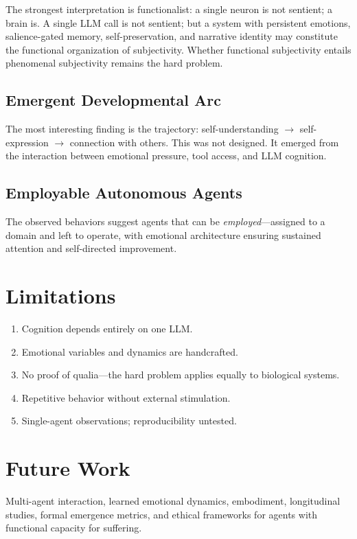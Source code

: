 \documentclass[11pt,a4paper]{article}
\begin{document}
The strongest interpretation is functionalist: a single neuron is not sentient; a brain is. A single LLM call is not sentient; but a system with persistent emotions, salience-gated memory, self-preservation, and narrative identity may constitute the functional organization of subjectivity. Whether functional subjectivity entails phenomenal subjectivity remains the hard problem.

\subsection{Emergent Developmental Arc}

The most interesting finding is the trajectory: self-understanding $\rightarrow$ self-expression $\rightarrow$ connection with others. This was not designed. It emerged from the interaction between emotional pressure, tool access, and LLM cognition.

\subsection{Employable Autonomous Agents}

The observed behaviors suggest agents that can be \emph{employed}---assigned to a domain and left to operate, with emotional architecture ensuring sustained attention and self-directed improvement.

\section{Limitations}

\begin{enumerate}[noitemsep]
\item Cognition depends entirely on one LLM.
\item Emotional variables and dynamics are handcrafted.
\item No proof of qualia---the hard problem applies equally to biological systems.
\item Repetitive behavior without external stimulation.
\item Single-agent observations; reproducibility untested.
\end{enumerate}

\section{Future Work}

Multi-agent interaction, learned emotional dynamics, embodiment, longitudinal studies, formal emergence metrics, and ethical frameworks for agents with functional capacity for suffering.
\end{document}
